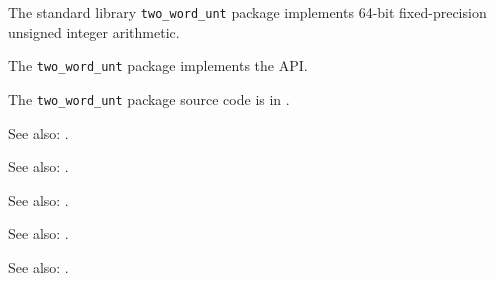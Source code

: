 
The standard library {\tt two\_word\_unt} package implements 64-bit fixed-precision unsigned integer arithmetic.

The {\tt two\_word\_unt} package implements the  API.

The {\tt two\_word\_unt} package source code is in .

See also:  .

See also:  .

See also:  .

See also:  .

See also:  .




